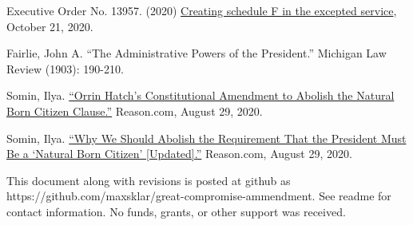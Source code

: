 \documentclass{article}
\newcommand{\quotes}[1]{``#1''}
\begin{document}
\begin{thebibliography}{20}
Executive Order No. 13957. (2020) \href{https://www.
federalregister.gov/documents/2020/10/26/2020-23780/creating-schedule-f-in-the-excepted-service}{Creating schedule F in the excepted service}, October 21, 2020.

Fairlie, John A. \quotes{The Administrative Powers of the President.} Michigan Law Review (1903): 190-210.

Somin, Ilya. \href{https://reason.com/volokh/2020/08/16/orrin-hatchs-constitutional-amendment-to-abolish-the-natural-born-citizen-clause/}{\quotes{Orrin Hatch’s Constitutional Amendment to Abolish the Natural Born Citizen Clause.}} Reason.com, August 29, 2020.

Somin, Ilya. \href{https://reason.com/volokh/2020/08/14/why-we-should-abolish-the-requirement-that-the-president-must-be-a-natural-born-citizen/}{\quotes{Why We Should Abolish the Requirement That the President Must Be a ‘Natural Born Citizen’ [Updated].}} Reason.com, August 29, 2020. 

\end{thebibliography}

This document along with revisions is posted at github as https://github.com/maxsklar/great-compromise-ammendment. See readme for contact information. No funds, grants, or other support was received.
\end{document}
